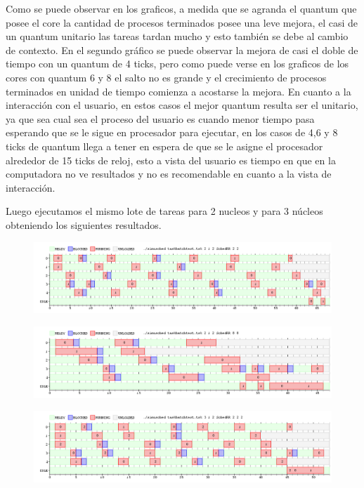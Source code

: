 Como se puede observar en los graficos, a medida que se agranda el quantum que posee el core la cantidad de procesos terminados posee una leve mejora, el casi de un quantum unitario las tareas tardan mucho y esto también se debe al cambio de contexto. En el segundo gráfico se puede observar la mejora de casi el doble de tiempo con un quantum de 4 ticks, pero como puede verse en los graficos de los cores con quantum 6 y 8 el salto no es grande y el crecimiento de procesos terminados en unidad de tiempo comienza a acostarse la mejora.
En cuanto a la interacción con el usuario, en estos casos el mejor quantum resulta ser el unitario, ya que sea cual sea el proceso del usuario es cuando menor tiempo pasa esperando que se le sigue en procesador para ejecutar, en los casos de 4,6 y 8 ticks de quantum llega a tener en espera de que se le asigne el procesador alrededor de 15 ticks de reloj, esto a vista del usuario es tiempo en que en la computadora no ve resultados y no es recomendable en cuanto a la vista de interacción.

Luego ejecutamos el mismo lote de tareas para 2 nucleos y para 3 núcleos obteniendo los siguientes resultados.


\begin{figure}[H]
  \centering
\includegraphics[scale=0.45]{graficos/ejercicio7/2testTask1.png}
  \caption[Task Batch con un nucleo y quantum 6]{}
\end{figure}


\begin{figure}[H]
  \centering
\includegraphics[scale=0.45]{graficos/ejercicio7/2testTask3.png}
  \caption[Task Batch con un nucleo y quantum 6]{}
\end{figure}


\begin{figure}[H]
  \centering
\includegraphics[scale=0.45]{graficos/ejercicio7/3testTask3.png}
  \caption[Task Batch con un nucleo y  quantum 8]{}
\end{figure}


